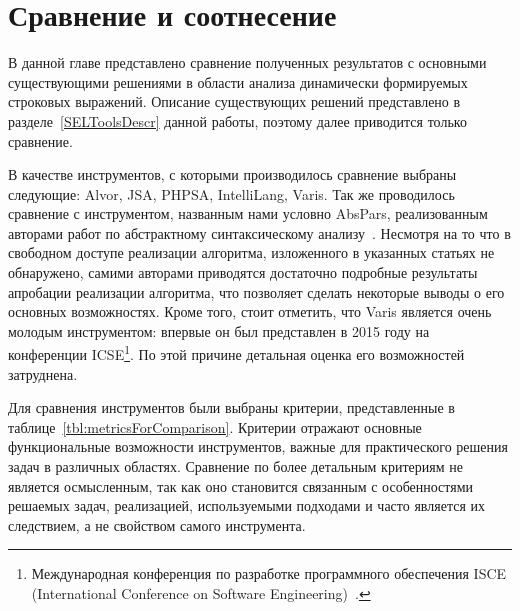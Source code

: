 \chapter{Сравнение и соотнесение} \label{chaptComp}

В данной главе представлено сравнение полученных результатов с основными существующими решениями в области анализа динамически формируемых строковых выражений. Описание существующих решений представлено 
в разделе~\ref{SELToolsDescr} данной работы, поэтому далее приводится только сравнение.

В качестве инструментов, с которыми производилось сравнение выбраны следующие: Alvor, JSA, PHPSA, IntelliLang, Varis. Так же проводилось сравнение с инструментом, названным нами 
условно AbsPars, реализованным авторами работ по абстрактному синтаксическому анализу~\cite{LrAbstract1, LrAbstract2, LRAbstractParsingSema}. Несмотря на то что в свободном доступе реализации 
алгоритма, изложенного в указанных статьях не обнаружено, самими авторами приводятся достаточно подробные результаты апробации реализации алгоритма, что позволяет сделать некоторые выводы о его 
основных возможностях. Кроме того, стоит отметить, что Varis является очень молодым инструментом: впервые он был представлен в 2015 году на конференции ICSE\footnote{Международная конференция по 
разработке программного обеспечения ISCE (International Conference on Software Engineering)~\cite{ICSE}.}. По этой причине детальная оценка его возможностей затруднена. 

Для сравнения инструментов были выбраны критерии, представленные в таблице~\ref{tbl:metricsForComparison}. Критерии отражают основные функциональные возможности инструментов, важные для практического решения задач в различных областях. Сравнение по более детальным критериям не является осмысленным, так как оно становится связанным с особенностями решаемых задач, реализацией, используемыми подходами и часто является их следствием, а не свойством самого инструмента.

